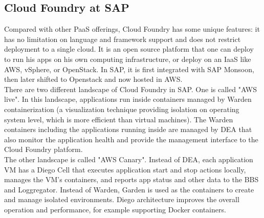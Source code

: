 \subsection{Cloud Foundry at SAP}
\label{cloud-foundry}
Compared with other PaaS offerings, Cloud Foundry has some unique features: it has no limitation on language and framework support and does not restrict deployment to a single cloud.  It is an open source platform that one can deploy to run his apps on his own computing infrastructure, or deploy on an IaaS like \ac{AWS}, vSphere, or OpenStack. In SAP, it is first integrated with SAP Monsoon, then later shifted to Openstack and now hosted in \ac{AWS}. \\
There are two different landscape of Cloud Foundry in SAP. One is called "AWS live". In this landscape, applications run inside containers managed by Warden   \citep{Warden} containerization (a visualization technique providing isolation on operating system level, which is more efficient than virtual machines). The Warden containers including the applications running inside are managed by \ac{DEA} that also monitor the application health and provide the management interface to the Cloud Foundry platform.\\
The other landscape is called "AWS Canary". Instead of \ac{DEA}, each application VM has a Diego Cell   \citep{Diego} that executes application start and stop actions locally, manages the VM’s containers, and reports app status and other data to the \ac{BBS} \citep{BBS} and Loggregator. Instead of Warden, Garden \citep{Garden} is used as the containers to create and manage isolated environments. Diego architecture improves the overall operation and performance, for example supporting Docker containers.

